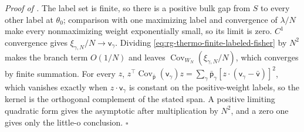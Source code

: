 \noindent\emph{Proof of .}
The label set is finite, so there is a positive bulk gap from $S$ to every other label at
$\theta_0$; comparison with one maximizing label and convergence of $\lambda/N$ make every
nonmaximizing weight exponentially small, so its limit is zero. $C^1$ convergence gives
$\xi_{\gamma,N}/N\to\mathsf v_\gamma$. Dividing \eqref{eq:rg-thermo-finite-labeled-fisher} by $N^2$
makes the branch term $O(1/N)$ and leaves $\operatorname{Cov}_{W_N}(\xi_{\gamma,N}/N)$, which
converges by finite summation. For every $z$,
$z^\top\operatorname{Cov}_{\bar{\mathsf p}}(\mathsf v_\gamma)z
=\sum_\gamma\bar{\mathsf p}_\gamma[z\cdot(\mathsf v_\gamma-\bar{\mathsf v})]^2$, which vanishes
exactly when $z\cdot\mathsf v_\gamma$ is constant on the positive-weight labels, so the kernel is the
orthogonal complement of the stated span. A positive limiting quadratic form gives the asymptotic
after multiplication by $N^2$, and a zero one gives only the little-o conclusion. $\square$

